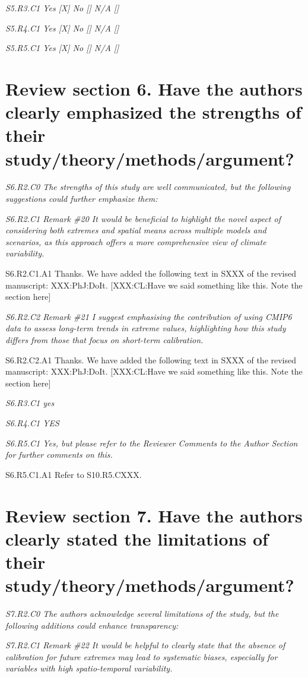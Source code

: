 \documentclass[a4paper,10pt]{article}
\begin{document}
	\emph{S5.R3.C1 Yes [X] No [] N/A []}

	\emph{S5.R4.C1 Yes [X] No [] N/A []}

	\emph{S5.R5.C1 Yes [X] No [] N/A []}

	\section*{Review section 6. Have the authors clearly emphasized the strengths of their study/theory/methods/argument?}

	\emph{S6.R2.C0 The strengths of this study are well communicated, but the following suggestions could further emphasize them:}

	\emph{S6.R2.C1 Remark \#20 It would be beneficial to highlight the novel aspect of considering both extremes and spatial means across multiple models and scenarios, as this approach offers a more comprehensive view of climate variability.}

	S6.R2.C1.A1 Thanks. We have added the following text in SXXX of the revised manuscript: XXX:PhJ:DoIt. [XXX:CL:Have we said something like this. Note the section here]

	\emph{S6.R2.C2 Remark \#21 I suggest emphasising the contribution of using CMIP6 data to assess long-term trends in extreme values, highlighting how this study differs from those that focus on short-term calibration.}

	S6.R2.C2.A1 Thanks. We have added the following text in SXXX of the revised manuscript: XXX:PhJ:DoIt. [XXX:CL:Have we said something like this. Note the section here]

	\emph{S6.R3.C1 yes}

	\emph{S6.R4.C1 YES}

	\emph{S6.R5.C1 Yes, but please refer to the Reviewer Comments to the Author Section for further comments on this.}

	S6.R5.C1.A1 Refer to S10.R5.CXXX.

	\section*{Review section 7. Have the authors clearly stated the limitations of their study/theory/methods/argument?}

	\emph{S7.R2.C0 The authors acknowledge several limitations of the study, but the following additions could enhance transparency:}

	\emph{S7.R2.C1 Remark \#22 It would be helpful to clearly state that the absence of calibration for future extremes may lead to systematic biases, especially for variables with high spatio-temporal variability.}
\end{document}
